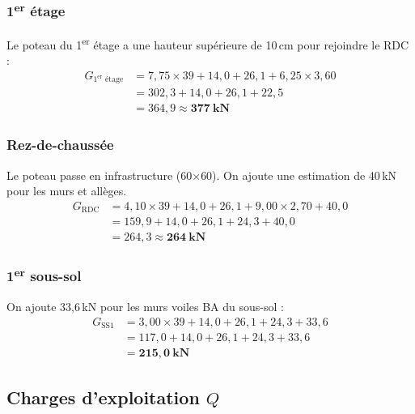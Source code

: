 \subsubsection{1\texorpdfstring{\textsuperscript{er}}{er} étage}

Le poteau du 1\textsuperscript{er} étage a une hauteur supérieure de 10\,cm pour rejoindre le RDC :
\[
\begin{aligned}
  G_{1^\text{er}\text{ étage}} &= 7{,}75 \times 39 + 14{,}0 + 26{,}1 + 6{,}25 \times 3{,}60 \\
                                &= 302{,}3 + 14{,}0 + 26{,}1 + 22{,}5 \\
                                &= 364{,}9 \approx \mathbf{377~\text{kN}}
\end{aligned}
\]

\subsubsection{Rez-de-chaussée}

Le poteau passe en infrastructure (60$\times$60). On ajoute une estimation de 40\,kN pour les murs et allèges.
\[
\begin{aligned}
  G_\text{RDC} &= 4{,}10 \times 39 + 14{,}0 + 26{,}1 + 9{,}00 \times 2{,}70 + 40{,}0 \\
               &= 159{,}9 + 14{,}0 + 26{,}1 + 24{,}3 + 40{,}0 \\
               &= 264{,}3 \approx \mathbf{264~\text{kN}}
\end{aligned}
\]

\subsubsection{1\texorpdfstring{\textsuperscript{er}}{er} sous-sol}

On ajoute 33,6\,kN pour les murs voiles BA du sous-sol :
\[
\begin{aligned}
  G_\text{SS1} &= 3{,}00 \times 39 + 14{,}0 + 26{,}1 + 24{,}3 + 33{,}6 \\
               &= 117{,}0 + 14{,}0 + 26{,}1 + 24{,}3 + 33{,}6 \\
               &= \mathbf{215{,}0~\text{kN}}
\end{aligned}
\]

\subsection{Charges d'exploitation \texorpdfstring{$Q$}{Q}}

